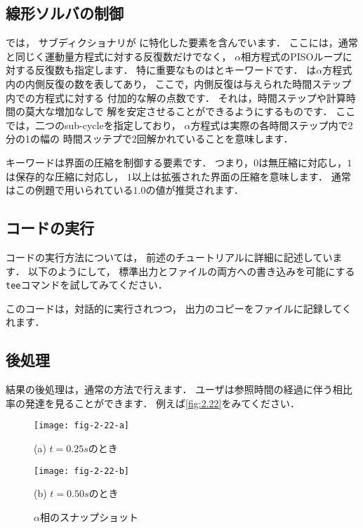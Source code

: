 \subsection{線形ソルバの制御}
\label{ssec:2.3.7}
では，
サブディクショナリが
に特化した要素を含んでいます．
ここには，通常と同じく運動量方程式に対する反復数だけでなく，
$\alpha$相方程式のPISOループに対する反復数も指定します．
特に重要なものはとキーワードです．
%
%
は$\alpha$方程式内の内側反復の数を表してあり，
ここで，内側反復は与えられた時間ステップ内での方程式に対する
付加的な解の点数です．
それは，時間ステップや計算時間の莫大な増加なしで
解を安定させることができるようにするものです．
ここでは，二つのsub-cycleを指定しており，
$\alpha$方程式は実際の各時間ステップ内で2分の1の幅の
時間スッテプで2回解かれていることを意味します．

%
%
キーワードは界面の圧縮を制御する要素です．
つまり，$0$は無圧縮に対応し，$1$は保存的な圧縮に対応し，
$1$以上は拡張された界面の圧縮を意味します．
通常はこの例題で用いられている$1.0$の値が推奨されます．


\subsection{コードの実行}
\label{ssec:2.3.8}
コードの実行方法については，
前述のチュートリアルに詳細に記述しています．
以下のようにして，
標準出力とファイルの両方への書き込みを可能にする
\texttt{tee}コマンドを試してみてください．
このコードは，対話的に実行されつつ，
出力のコピーをファイルに記録してくれます．


\subsection{後処理}
\label{ssec:2.3.9}
結果の後処理は，通常の方法で行えます．
ユーザは参照時間の経過に伴う相比率の発達を見ることができます．
例えば\autoref{fig:2.22}をみてください．


\begin{figure}[ht]
 \texttt{[image: fig-2-22-a]}\par
 (a) $t = 0.25\unit{s}$のとき\par
 \medskip
 \texttt{[image: fig-2-22-b]}\par
 (b) $t = 0.50\unit{s}$のとき
 \caption{$\alpha$相のスナップショット}
 \label{fig:2.22}
\end{figure}



